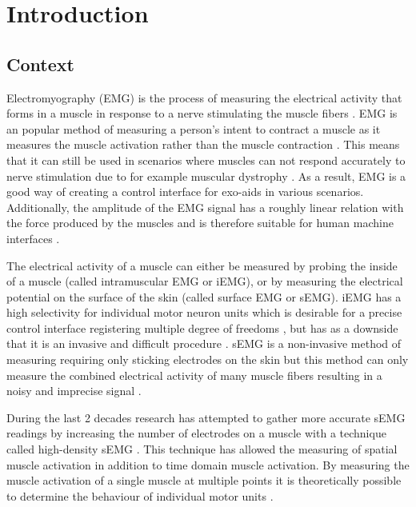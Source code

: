 \chapter{Introduction}
\section{Context}
Electromyography (EMG) is the process of measuring the electrical activity that forms in a muscle in response to a nerve stimulating the muscle fibers \cite{biomechanics_research_methods} \cite{wikipedia_emg}. EMG is an popular method of measuring a person's intent to contract a muscle as it measures the muscle activation rather than the muscle contraction \cite{control_interfaces_intention_detection}. This means that it can still be used in scenarios where muscles can not respond accurately to nerve stimulation due to for example muscular dystrophy \cite{emg_arm_function_boys_pilot}. As a result, EMG is a good way of creating a control interface for exo-aids in various scenarios. Additionally, the amplitude of the EMG signal has a roughly linear relation with the force produced by the muscles and is therefore suitable for human machine interfaces \cite{adaptive_filter_dry_electrode}.

The electrical activity of a muscle can either be measured by probing the inside of a muscle (called intramuscular EMG or iEMG), or by measuring the electrical potential on the surface of the skin (called surface EMG or sEMG). iEMG has a high selectivity for individual motor neuron units which is desirable for a precise control interface registering multiple degree of freedoms \cite{semg_vs_iemg}, but has as a downside that it is an invasive and difficult procedure \cite{intramuscular_emg_signals}. sEMG is a non-invasive method of measuring requiring only sticking electrodes on the skin but this method can only measure the combined electrical activity of many muscle fibers resulting in a noisy and imprecise signal \cite{wiki:Electromyography}. 

During the last 2 decades research has attempted to gather more accurate sEMG readings by increasing the number of electrodes on a muscle with a technique called high-density sEMG \cite{high_density_semg}. 
This technique has allowed the measuring of spatial muscle activation in addition to time domain muscle activation. By measuring the muscle activation of a single muscle at multiple points it is theoretically possible to determine the behaviour of individual motor units \cite{high_density_semg_clinical_applications}.

